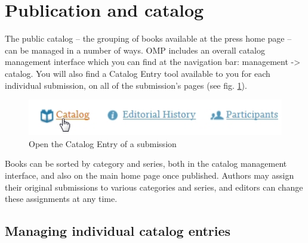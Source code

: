 
\newpage


\section{Publication and catalog} \label{sec:catalog}

The public catalog -- the grouping of books available at the press home page -- can be managed in a number of ways. OMP includes an overall catalog management interface which you can find at the navigation bar: management -> catalog. You will also find a Catalog Entry tool available to you for each individual submission, on all of the submission's pages (see fig. \ref{fig:catalog}).

\begin{figure}[h] \centering
\includegraphics[width=1\textwidth]{./img/catalog.jpg} \caption{Open the Catalog Entry of a submission}
\label{fig:catalog}
\end{figure}

Books can be sorted by category and series, both in the catalog management interface, and also on the main home page once published. Authors may assign their original submissions to various categories and series, and editors can change these assignments at any time. 

\subsection*{Managing individual catalog entries}


